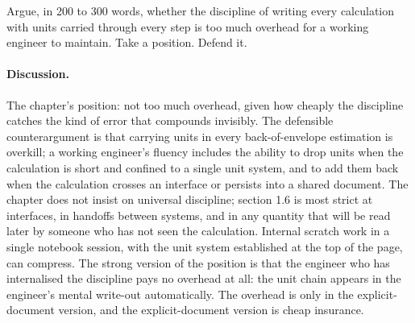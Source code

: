 \begin{exercise}
Argue, in 200 to 300 words, whether the discipline of writing every
calculation with units carried through every step is too much
overhead for a working engineer to maintain. Take a position. Defend
it.

\paragraph{Discussion.}
The chapter's position: not too much overhead, given how cheaply the
discipline catches the kind of error that compounds invisibly. The
defensible counterargument is that carrying units in every
back-of-envelope estimation is overkill; a working engineer's
fluency includes the ability to drop units when the calculation is
short and confined to a single unit system, and to add them back
when the calculation crosses an interface or persists into a
shared document. The chapter does not insist on universal
discipline; section 1.6 is most strict at interfaces, in handoffs
between systems, and in any quantity that will be read later by
someone who has not seen the calculation. Internal scratch work in
a single notebook session, with the unit system established at the
top of the page, can compress.
The strong version of the position is that the engineer who has
internalised the discipline pays no overhead at all: the unit chain
appears in the engineer's mental write-out automatically. The
overhead is only in the explicit-document version, and the
explicit-document version is cheap insurance.
\end{exercise}

